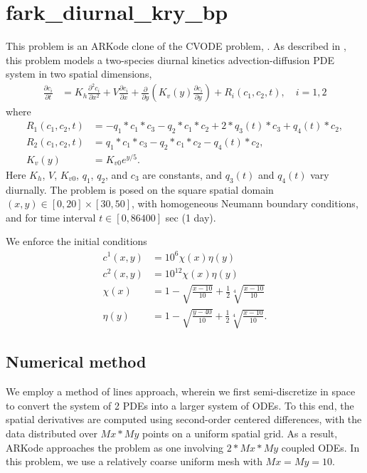 \documentclass[letterpaper,10pt,english]{sphinxmanual}
\begin{document}
\section{fark\_diurnal\_kry\_bp}
\label{\detokenize{f77_serial:id1}}\label{\detokenize{f77_serial:fark-diurnal-kry-bp}}
This problem is an ARKode clone of the CVODE problem,
.  As described in \label{\detokenize{f77_serial:id2}}{\hyperref[\detokenize{References:hsr2017}]{\sphinxcrossref{{[}HSR2017{]}}}}, this problem
models a two-species diurnal kinetics advection-diffusion PDE system
in two spatial dimensions,
\begin{equation*}
\begin{split}\frac{\partial c_i}{\partial t} &=
  K_h \frac{\partial^2 c_i}{\partial x^2} +
  V \frac{\partial     c_i}{\partial x} +
  \frac{\partial}{\partial y}\left( K_v(y)
  \frac{\partial c_i}{\partial y}\right) +
  R_i(c_1,c_2,t),\quad i=1,2\end{split}
\end{equation*}
where
\begin{equation*}
\begin{split}R_1(c_1,c_2,t) &= -q_1*c_1*c_3 - q_2*c_1*c_2 + 2*q_3(t)*c_3 + q_4(t)*c_2, \\
R_2(c_1,c_2,t) &=  q_1*c_1*c_3 - q_2*c_1*c_2 - q_4(t)*c_2, \\
K_v(y) &= K_{v0} e^{y/5}.\end{split}
\end{equation*}
Here \(K_h\), \(V\), \(K_{v0}\), \(q_1\), \(q_2\),
and \(c_3\) are constants, and \(q_3(t)\) and \(q_4(t)\)
vary diurnally.  The problem is posed on the square spatial domain
\((x,y) \in [0,20]\times[30,50]\), with homogeneous Neumann
boundary conditions, and for time interval \(t\in [0,86400]\) sec
(1 day).

We enforce the initial conditions
\begin{equation*}
\begin{split}c^1(x,y) &=  10^6 \chi(x)\eta(y) \\
c^2(x,y) &=  10^{12} \chi(x)\eta(y) \\
\chi(x) &= 1 - \sqrt{\frac{x - 10}{10}} + \frac12 \sqrt[4]{\frac{x - 10}{10}} \\
\eta(y) &= 1 - \sqrt{\frac{y - 40}{10}} + \frac12 \sqrt[4]{\frac{x - 10}{10}}.\end{split}
\end{equation*}

\subsection{Numerical method}
\label{\detokenize{f77_serial:numerical-method}}
We employ a method of lines approach, wherein we first semi-discretize
in space to convert the system of 2 PDEs into a larger system of ODEs.
To this end, the spatial derivatives are computed using second-order
centered differences, with the data distributed over \(Mx*My\)
points on a uniform spatial grid.  As a result, ARKode approaches the
problem as one involving \(2*Mx*My\) coupled ODEs. In this
problem, we use a relatively coarse uniform mesh with
\(Mx=My=10\).
\end{document}
